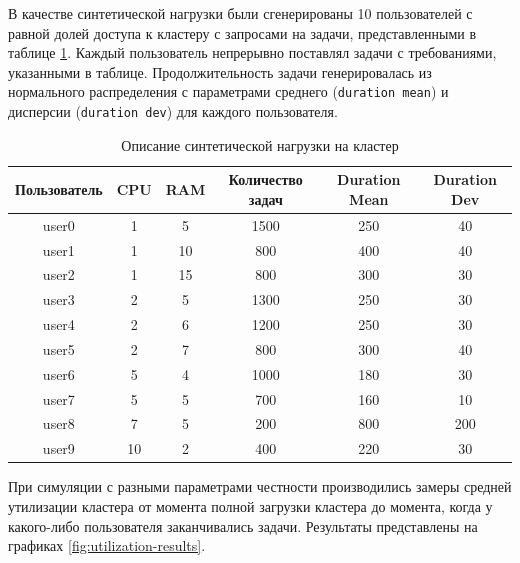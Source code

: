 В качестве синтетической нагрузки были сгенерированы 10 пользователей с равной долей доступа к кластеру с запросами на задачи, представленными в таблице \ref{tab:tasks_load_description}. Каждый пользователь непрерывно поставлял задачи с требованиями, указанными в таблице. Продолжительность задачи генерировалась из нормального распределения с параметрами среднего (\texttt{duration mean}) и дисперсии (\texttt{duration dev}) для каждого пользователя. 

\begin{table}[h!]
    \centering
    \begin{tabular}{|c|c|c|c|c|c|}
        \hline
        \textbf{Пользователь} & \textbf{CPU} & \textbf{RAM} & \textbf{Количество задач} & \textbf{Duration Mean} & \textbf{Duration Dev} \\
        \hline
        user0 & 1 & 5 & 1500 & 250 & 40 \\
        \hline
        user1 & 1 & 10 & 800 & 400 & 40 \\
        \hline
        user2 & 1 & 15 & 800 & 300 & 30 \\
        \hline
        user3 & 2 & 5 & 1300 & 250 & 30 \\
        \hline
        user4 & 2 & 6 & 1200 & 250 & 30 \\
        \hline
        user5 & 2 & 7 & 800 & 300 & 40 \\
        \hline
        user6 & 5 & 4 & 1000 & 180 & 30 \\
        \hline
        user7 & 5 & 5 & 700 & 160 & 10 \\
        \hline
        user8 & 7 & 5 & 200 & 800 & 200 \\
        \hline
        user9 & 10 & 2 & 400 & 220 & 30 \\
        \hline
    \end{tabular}
    \caption{Описание синтетической нагрузки на кластер}
    \label{tab:tasks_load_description}
\end{table}


При симуляции с разными параметрами честности производились замеры средней утилизации кластера от момента полной загрузки кластера до момента, когда у какого-либо пользователя заканчивались задачи. Результаты представлены на графиках \ref{fig:utilization-results}.

